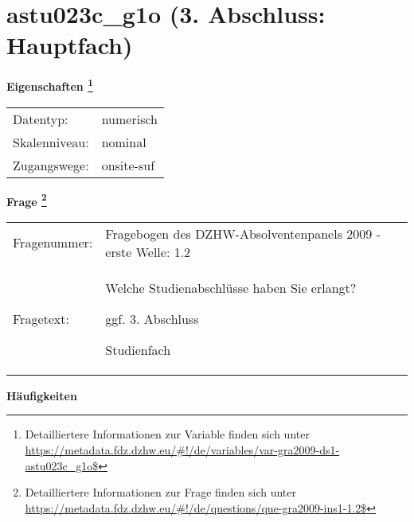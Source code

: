 
    \setcounter{footnote}{0}

    \vspace*{-1.8cm}
	\section{astu023c\_g1o (3. Abschluss: Hauptfach)}
	\label{section:astu023c_g1o}



    \vspace*{0.5cm}
    \noindent\textbf{Eigenschaften
	\footnote{Detailliertere Informationen zur Variable finden sich unter
		\url{https://metadata.fdz.dzhw.eu/\#!/de/variables/var-gra2009-ds1-astu023c_g1o$}}}\\
	\begin{tabularx}{\hsize}{@{}lX}
	Datentyp: & numerisch \\
	Skalenniveau: & nominal \\
	Zugangswege: &
	  onsite-suf
 \\
    \end{tabularx}



				\vspace*{0.5cm}
                \noindent\textbf{Frage
	                \footnote{Detailliertere Informationen zur Frage finden sich unter
		              \url{https://metadata.fdz.dzhw.eu/\#!/de/questions/que-gra2009-ins1-1.2$}}}\\
				\begin{tabularx}{\hsize}{@{}lX}
					Fragenummer: &
					  Fragebogen des DZHW-Absolventenpanels 2009 - erste Welle:
					  1.2
 \\
					Fragetext: & Welche Studienabschlüsse haben Sie erlangt?\par  ggf. 3. Abschluss\par  Studienfach \\
				\end{tabularx}





        		\vspace*{0.5cm}
                \noindent\textbf{Häufigkeiten}

